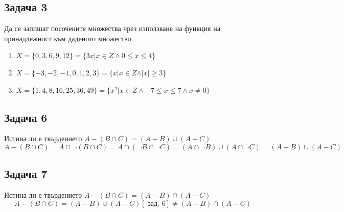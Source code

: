\documentclass[fleqn, 12pt]{article}
\theoremstyle{definition}
\begin{document}
\subsection*{Задача 3}
Да  се  запишат  посочените  множества  чрез  използване  на  функция  на принадлежност към даденото множество
\begin{enumerate}
\item $X = \{0,3,6,9,12 \} = \{3x \vert x \in Z  \land 0 \leq x \leq 4 \}$
\item $X = \{-3,-2,-1,0,1,2,3 \} = \{x \vert x \in Z  \land \vert x \vert \geq 3 \}$
\item $X =\{1,4,8,16,25,36,49 \} = \{x^2 \vert x \in Z \land  -7 \leq x \leq 7 \land x \neq 0\}$
\end{enumerate}
\subsection*{Задача 6}
Истина ли е твърдението $A - (B \cap C) = (A-B) \cup (A - C)$
$$A - (B \cap C) = A \cap \neg(B \cap C) = A \cap ( \neg B \cap  \neg C) = (A \cap \neg B) \cup (A \cap  \neg C) = (A-B) \cup (A - C)$$
\subsection*{Задача 7}
Истина ли е твърдението $A - (B \cap C) = (A-B) \cap (A - C)$
$$A - (B \cap C) = (A-B) \cup (A - C) [\text{ зад. 6}] \neq (A-B) \cap (A - C) $$
\newpage
\end{document}
